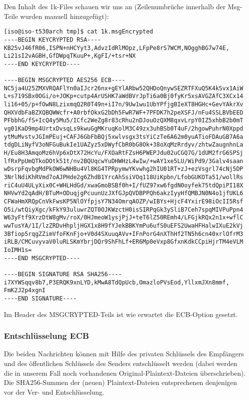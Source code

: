 Den Inhalt des 1k-Files schauen wir uns an (Zeilenumbrüche innerhalb der Msg-Teile wurden manuell hinzugefügt):
\begin{lstlisting}
[iso@iso-t530arch tmp]$ cat 1k.msgEncrypted 
----BEGIN KEYCRYPTED RSA----
KB25vJ46fR06,ISPN+nHCYyt3,AdvzIdRlMOpz,LFpPe8rS7WCM,NOgghBG7w74E,
Li21sI2vAGBH,GfDWpqTKuuP+,KgFI/+tsr+NX
----END KEYCRYPTED----

----BEGIN MSGCRYPTED AES256 ECB----
NC5ja4U25ZMXVRQAFlYn0aIJcr26nx+gEYlARbw52QHDoQnywSEZRTFXuQ5K4kSvx1AiW
L+s719SBx0OGi/o+JOKp+cutp4ArUSHK7aWdBVrJpTi6a0Bj0fyKr5xsAVGZAfC3XCx14
li16+05/p+fOwN8LzixmqQ2R0T49n+iI7n/9Uw1wu1UbYPfjgBIeXT8HGHc+GevYAkrXv
QHXVdbFaBZXQBQWWcfr+A0rbfOkxG2bDh5FwR7WF+7PFDK7h2peXSFJ/nFu4SSLBVbEED
PFbbhG/fS+IcQ4y5Mu5/ICfc2WeZg8r83cRhu2nDJouOzQXM8qxvLrpY0IZ5xhbB2b0mT
vg01KaD9mp4UrtxDvsqLs9kwuGgMKruqKolM3C49zx3uhBSb0T4uF/2hgowPuhrN0Xppd
ytMuMvstvJGImPEuj+CAFJ6GbFbBQj5xwlvsgx3tsYiCzTe6A62m0yuATioFDAuGB7A6a
tdgDLiNyfV3oNFGuBukIe1UAZyz5xDWyfCbR0bG8Ok+38oXqMzRrdyv/zhtwZaugnhnLa
H/Eu8H3AmqoMz6hVp6xDtX72HcYu/FXOaRtFZsH6PWEPJdu02uCGQ7G/1dUM2frG6SPSj
lfRxPpUmQTkoDOtk51t/nv2BQUqcwYuDHWHzL4wIw/+wAY1xe5LU/WiPd9/3Galv4saan
wDsrpFqvbgMdPkOW6wNHBu4Vl8KG4TPRpymwYKvwhg2hIU01RT+zJ+ezVsgrl74cNj5DP
3NrlNdiKhRVmd7oAJPHde2g6ZhdB1YrcAhSsiVOq118UiKpbn/LfobGUKOTa51/wollRs
riC4uU4ULyXix0C+WHLHdGd/xwaGmoBSBf0h+I/fUZ97xw6fgdN0oyfek75tdQpiPI18X
NHVwYd2qAdH/BTuM+ODuqjgPcuunUzJXfGJpQVDBPPQh6akzIyyHfQMBJN0N4o1jfUKL6
CFWaHmXRQpCnVkFwsKP5NlOYfpjsY7N34OmrqAOZP/wIBYs+HjcF4YxirE98iOcII5Rsf
O5i/wtQiyXgc/kFkY93uluwrZQT0OJKWzctH0isSIRPqGk3ySliB7Ceh7spqMIVPuPpn4
W63yFtf9XrzDtW8gMv/roX/0HJmeoW1ysjPjJ+teT6lZ50REmh4/LFGjkRQx2n1x+wflC
wwTusYA/1I/lzZRDvHhpljHGX1x8H9fYJekBBKYmPu6ufS0uEFS2UwaHFHalwIXuE2kVj
3Bfiop5rqgZZimVfoFKnFjo+V0d4SXuuqAVv+IFnPorG4nXThHf2TN5h6cn40xrlOfrM3
iRLB/CMCuvyvaV0luRLSKmYbrjDQr9ShFhLf+ER6Mp0eVxp8GfxnKdkCCpiHjrTM4eVLM
IoIMH1s=
----END MSGCRYPTED----

----BEGIN SIGNATURE RSA SHA256----
i7XYWSqqv8b7,P3ERQK9xnLYD,kMwA8TdQpUcb,OmazloPVsEod,YllxmJXn8mmf,
FmK2J2p4xgnI
----END SIGNATURE----
\end{lstlisting}

Im Header des MSGCRYPTED-Teils ist wie erwartet die ECB-Option gesetzt.

\subsubsection{Entschlüsselung ECB}
Die beiden Nachrichten können mit Hilfe des privaten Schlüssels des Empfängers und des öffentlichen Schlüssels des Senders entschlüsselt werden (dabei werden die in unserem Fall noch vorhandenen Original-Plaintext-Dateien überschrieben). Die SHA256-Summen der (neuen) Plaintext-Dateien entsprechenen denjenigen vor der Ver- und Entschlüsselung.

